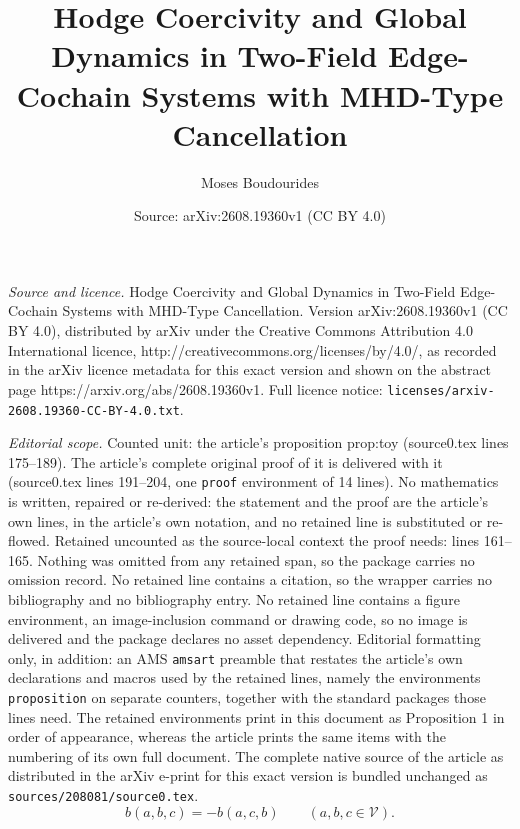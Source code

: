 \documentclass[10pt,a4paper]{amsart}
\title{Hodge Coercivity and Global Dynamics in Two-Field Edge-Cochain Systems with MHD-Type Cancellation}
\author{Moses Boudourides}
\date{Source: arXiv:2608.19360v1 (CC BY 4.0)}
\begin{document}
\maketitle

\noindent\emph{Source and licence.} Hodge Coercivity and Global Dynamics in Two-Field Edge-Cochain Systems with MHD-Type Cancellation. Version arXiv:2608.19360v1 (CC BY 4.0), distributed by arXiv under the Creative Commons Attribution 4.0 International licence, http://creativecommons.org/licenses/by/4.0/, as recorded in the arXiv licence metadata for this exact version and shown on the abstract page https://arxiv.org/abs/2608.19360v1. Full licence notice: \texttt{licenses/arxiv-2608.19360-CC-BY-4.0.txt}.\par\smallskip

\noindent\textit{Editorial scope.} Counted unit: the article's proposition prop:toy (source0.tex lines 175--189). The article's complete original proof of it is delivered with it (source0.tex lines 191--204, one \texttt{proof} environment of 14 lines). No mathematics is written, repaired or re-derived: the statement and the proof are the article's own lines, in the article's own notation, and no retained line is substituted or re-flowed.  Retained uncounted as the source-local context the proof needs: lines 161--165.  Nothing was omitted from any retained span, so the package carries no omission record.  No retained line contains a citation, so the wrapper carries no bibliography and no bibliography entry.  No retained line contains a figure environment, an image-inclusion command or drawing code, so no image is delivered and the package declares no asset dependency.  Editorial formatting only, in addition: an AMS \texttt{amsart} preamble that restates the article's own declarations and macros used by the retained lines, namely the environments \texttt{proposition} on separate counters, together with the standard packages those lines need.  The retained environments print in this document as Proposition 1 in order of appearance, whereas the article prints the same items with the numbering of its own full document.  The complete native source of the article as distributed in the arXiv e-print for this exact version is bundled unchanged as \texttt{sources/208081/source0.tex}.
\begin{equation}
b(a,b,c)=-b(a,c,b)
\qquad(a,b,c\in\mathcal V).
\label{eq:antisymmetry}
\end{equation}
\end{document}
